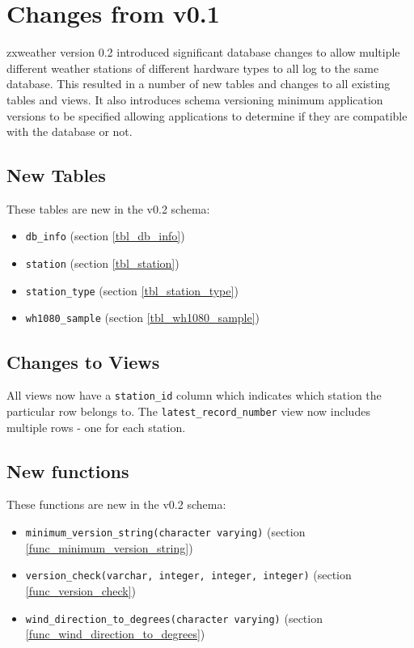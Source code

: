 \documentclass[a4paper,10pt]{book}
\begin{document}
\section{Changes from v0.1}
zxweather version 0.2 introduced significant database changes to allow multiple different weather stations of different hardware types to all log to the same database. This resulted in a number of new tables and changes to all existing tables and views. It also introduces schema versioning minimum application versions to be specified allowing applications to determine if they are compatible with the database or not.

\subsection{New Tables}
These tables are new in the v0.2 schema:
\begin{itemize}
\item \verb|db_info| (section \ref{tbl_db_info})
\item \verb|station| (section \ref{tbl_station})
\item \verb|station_type| (section \ref{tbl_station_type})
\item \verb|wh1080_sample| (section \ref{tbl_wh1080_sample})
\end{itemize}

\subsection{Changes to Views}
All views now have a \verb|station_id| column which indicates which station the particular row belongs to. The \verb|latest_record_number| view now includes multiple rows - one for each station.

\subsection{New functions}
These functions are new in the v0.2 schema:
\begin{itemize}
\item \verb|minimum_version_string(character varying)| (section \ref{func_minimum_version_string})
\item \verb|version_check(varchar, integer, integer, integer)| (section \ref{func_version_check})
\item \verb|wind_direction_to_degrees(character varying)| (section \ref{func_wind_direction_to_degrees})
\end{itemize}
\end{document}
